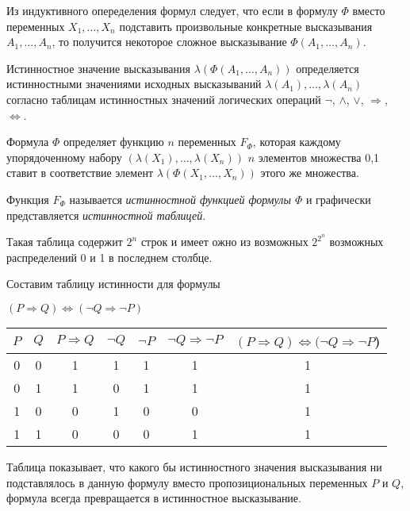 Из индуктивного опеределения формул следует, что если в формулу $\Phi$ вместо переменных $X_1,\dots,X_n$ подставить произвольные конкретные высказывания $A_1,\dots,A_n$, то получится некоторое сложное высказывание $\Phi(A_1,\dots,A_n)$.

Истинностное значение высказывания $\lambda(\Phi(A_1,\dots,A_n))$ определяется истинностными значениями исходных высказываний $\lambda(A_1),\dots,\lambda(A_n)$ согласно таблицам истинностных значений логических операций $\lnot $, $\land $, $\lor $, $\Rightarrow $, $\Leftrightarrow $.

Формула $\Phi$ определяет функцию $n$ переменных $F_\Phi$, которая каждому упорядоченному набору $(\lambda(X_1),\dots,\lambda(X_n))$ $n$ элементов множества {0,1} ставит в соответствие элемент $\lambda(\Phi(X_1,\dots,X_n))$ этого же множества.

\begin{definition}
    Функция $F_\Phi$ называется \textit{истинностной функцией формулы $\Phi$} и графически представляется \textit{истинностной таблицей}.

    Такая таблица содержит $2^n$ строк и имеет ожно из возможных $2^{2^n}$ возможных распределений 0 и 1 в последнем столбце.
\end{definition}

\begin{example}
    Составим таблицу истинности для формулы 
    
    $(P\Rightarrow Q) \Leftrightarrow (\lnot Q \Rightarrow \lnot P)$

    \begin{center}
        \begin{tabular}{|c|c|c|c|c|c|c|}
            \hline
            $P$ & $Q$ & $P \Rightarrow Q$ & $\lnot Q$ & $\lnot P$ & $\lnot Q \Rightarrow \lnot P$ & $(P\Rightarrow Q)\Leftrightarrow (\lnot Q \Rightarrow \lnot P$) \\ \hline
            0   & 0   & 1                 & 1         & 1         & 1                             & 1                                                              \\ \hline
            0   & 1   & 1                 & 0         & 1         & 1                             & 1                                                              \\ \hline
            1   & 0   & 0                 & 1         & 0         & 0                             & 1                                                              \\ \hline
            1   & 1   & 0                 & 0         & 0         & 1                             & 1                                                              \\ \hline
            \end{tabular}
    \end{center}

    Таблица показывает, что какого бы истинностного значения высказывания ни подставлялось в данную формулу вместо пропозициональных переменных $P$ и $Q$, формула всегда превращается в истинностное высказывание.
\end{example}

